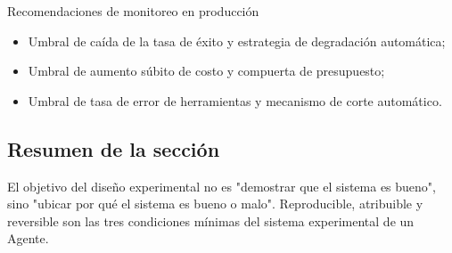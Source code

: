 \begin{knowledgebox}{Recomendaciones de monitoreo en producción}
\begin{itemize}
    \item Umbral de caída de la tasa de éxito y estrategia de degradación automática;
    \item Umbral de aumento súbito de costo y compuerta de presupuesto;
    \item Umbral de tasa de error de herramientas y mecanismo de corte automático.
\end{itemize}
\end{knowledgebox}

\subsection{Resumen de la sección}
El objetivo del diseño experimental no es "demostrar que el sistema es bueno", sino "ubicar por qué el sistema es bueno o malo". Reproducible, atribuible y reversible son las tres condiciones mínimas del sistema experimental de un Agente.

